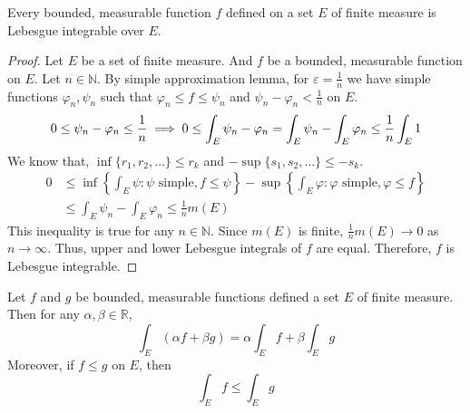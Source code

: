 \begin{theorem}
	Every bounded, measurable function $f$ defined on a set $E$ of finite measure is Lebesgue integrable over $E$.
\end{theorem}
\begin{proof}
	Let $E$ be a set of finite measure.
	And $f$ be a bounded, measurable function on $E$.
	Let $n \in \mathbb{N}$.
	By simple approximation lemma, for $\varepsilon = \frac{1}{n}$ we have simple functions $\varphi_n,\psi_n$ such that $\varphi_n \le f \le \psi_n$ and $\psi_n - \varphi_n < \frac{1}{n}$ on $E$.
	\begin{equation*}
		0 \le \psi_n - \varphi_n \le \frac{1}{n} \implies 0 \le \int_E \psi_n - \varphi_n  = \int_E \psi_n - \int_E \varphi_n \le \frac{1}{n} \int_E 1 \\
	\end{equation*}
	We know that, $\inf \{r_1,r_2,\dots\} \le r_k$ and $-\sup\{s_1,s_2,\dots\} \le -s_k$.
	\begin{align*}
		0 & \le \inf \left\{ \int_E \psi : \psi \text{ simple}, f \le \psi \right\} - \sup \left\{ \int_E \varphi : \varphi \text{ simple}, \varphi \le f \right\}\\
		& \le \int_E \psi_n - \int_E \varphi_n \le \frac{1}{n} m(E)
	\end{align*}
	This inequality is true for any $n \in \mathbb{N}$.
	Since $m(E)$ is finite, $\frac{1}{n} m(E) \to 0$ as $n \to \infty$.
	Thus, upper and lower Lebesgue integrals of $f$ are equal.
	Therefore, $f$ is Lebesgue integrable.
\end{proof}
\begin{theorem}
	Let $f$ and $g$ be bounded, measurable functions defined a set $E$ of finite measure.
	Then for any $\alpha,\beta \in \mathbb{R}$,
	\begin{equation}
		\int_E (\alpha f + \beta g) = \alpha \int_E f + \beta \int_E g
	\end{equation}
	Moreover, if $f \le g$ on $E$, then
	\begin{equation}
		\int_E f \le \int_E g
	\end{equation}

\end{theorem}
